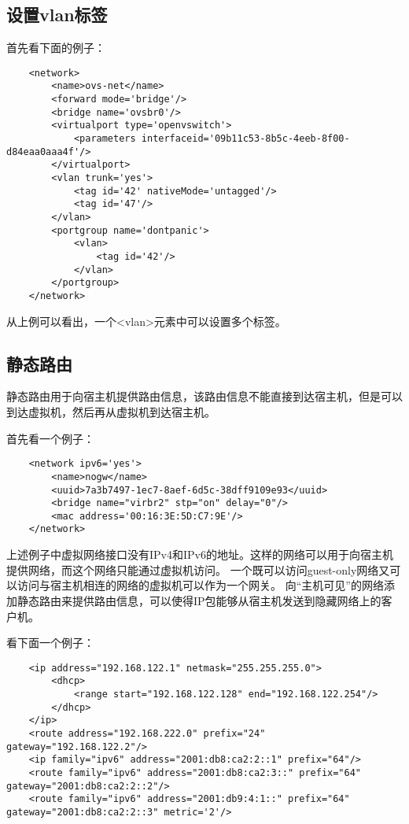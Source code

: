 \documentclass[a4paper,left=2.5cm,right=2.5cm,11pt]{article}
\begin{document}
\subsection{设置vlan标签}
	首先看下面的例子：
	\begin{lstlisting}
	<network>
		<name>ovs-net</name>
		<forward mode='bridge'/>
		<bridge name='ovsbr0'/>
		<virtualport type='openvswitch'>
			<parameters interfaceid='09b11c53-8b5c-4eeb-8f00-d84eaa0aaa4f'/>
		</virtualport>
		<vlan trunk='yes'>
			<tag id='42' nativeMode='untagged'/>
			<tag id='47'/>
		</vlan>
		<portgroup name='dontpanic'>
			<vlan>
				<tag id='42'/>
			</vlan>
		</portgroup>
	</network>
	\end{lstlisting}

	从上例可以看出，一个<vlan>元素中可以设置多个标签。

\subsection{静态路由}
	静态路由用于向宿主机提供路由信息，该路由信息不能直接到达宿主机，但是可以到达虚拟机，然后再从虚拟机到达宿主机。\par

	首先看一个例子：
	\begin{lstlisting}
	<network ipv6='yes'>
		<name>nogw</name>
		<uuid>7a3b7497-1ec7-8aef-6d5c-38dff9109e93</uuid>
		<bridge name="virbr2" stp="on" delay="0"/>
		<mac address='00:16:3E:5D:C7:9E'/>
	</network>
	\end{lstlisting}

	上述例子中虚拟网络接口没有IPv4和IPv6的地址。这样的网络可以用于向宿主机提供网络，而这个网络只能通过虚拟机访问。
	一个既可以访问guest-only网络又可以访问与宿主机相连的网络的虚拟机可以作为一个网关。
	向“主机可见”的网络添加静态路由来提供路由信息，可以使得IP包能够从宿主机发送到隐藏网络上的客户机。\par

	看下面一个例子：
	\begin{lstlisting}
	<ip address="192.168.122.1" netmask="255.255.255.0">
		<dhcp>
			<range start="192.168.122.128" end="192.168.122.254"/>
		</dhcp>
	</ip>
	<route address="192.168.222.0" prefix="24" gateway="192.168.122.2"/>
	<ip family="ipv6" address="2001:db8:ca2:2::1" prefix="64"/>
	<route family="ipv6" address="2001:db8:ca2:3::" prefix="64" gateway="2001:db8:ca2:2::2"/>
	<route family="ipv6" address="2001:db9:4:1::" prefix="64" gateway="2001:db8:ca2:2::3" metric='2'/>
	\end{lstlisting}
\end{document}
